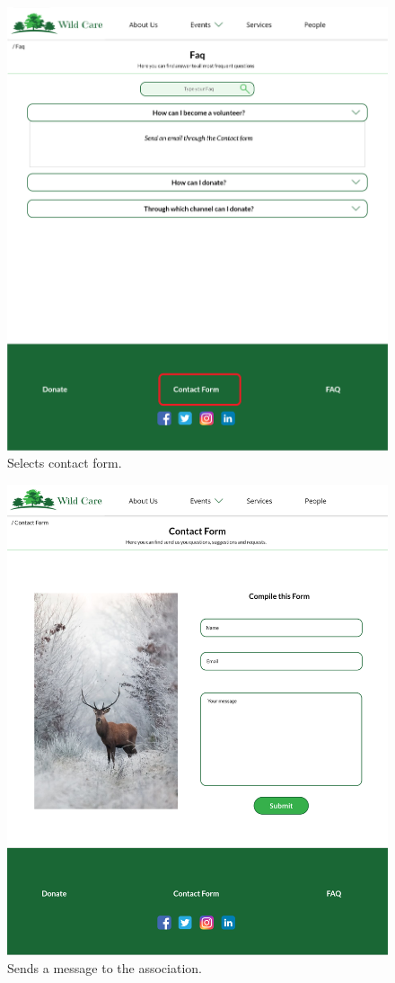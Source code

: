 	\begin{figure}[h!]
		\centering
		\begin{minipage}[b]{1\textwidth}
    			\includegraphics[width=\textwidth]{./assets/mockups/faq_contactform.png}
			\caption{Selects contact form.}
		\end{minipage}
	\end{figure}

	\begin{figure}[h!]
		\centering
		\begin{minipage}[b]{1\textwidth}
    			\includegraphics[width=\textwidth]{./assets/mockups/contactform.png}
			\caption{Sends a message to the association.}
		\end{minipage}
	\end{figure}